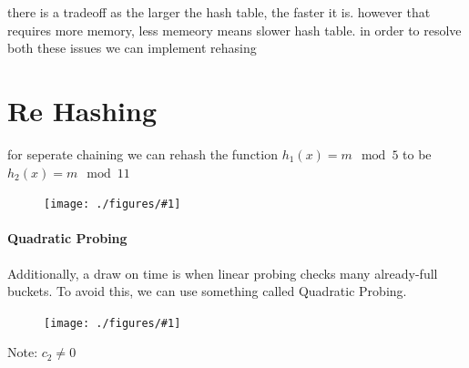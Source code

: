 \documentclass[12pt]{book}
\newcommand{\incimg}[2]{%
       \begin{figure}[h]
               \centering
               \texttt{[image: ./figures/\#1]}
       \end{figure}
}
\begin{document}
there is a tradeoff as the larger the hash table, the faster it is. however that requires more memory, less memeory means slower hash table. in order to 
resolve both these issues we can implement rehasing

\section*{Re Hashing}
for seperate chaining we can rehash the function $h_1(x) = m\mod 5$ to be $h_2(x) = m\mod 11$
\incimg{rehash}{0.5}

\paragraph{Quadratic Probing}
Additionally, a draw on time is when linear probing checks many already-full buckets. To avoid this, we can use something
called Quadratic Probing.
\incimg{quad}{0.5}

Note: $c_2 \neq 0$
\pagebreak
\end{document}
